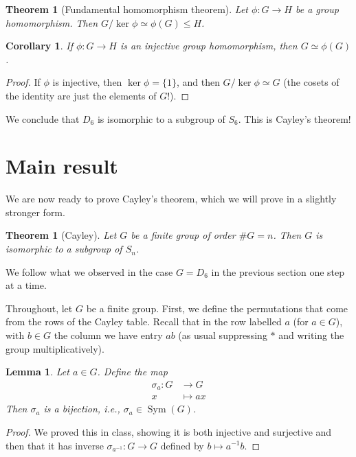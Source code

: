 \documentclass[12pt]{amsart}
\numberwithin{equation}{section}
\newtheorem{thm}[equation]{Theorem}
\newtheorem{lem}[equation]{Lemma}
\newtheorem{corollary}[equation]{Corollary}
\theoremstyle{definition}
\theoremstyle{remark}
\numberwithin{equation}{section}
\DeclareMathOperator{\Sym}{Sym}
\begin{document}
\begin{thm}[Fundamental homomorphism theorem]
Let $\phi \colon G \to H$ be a group homomorphism.  Then $G/\ker \phi \simeq \phi(G) \leq H$.
\end{thm}

\begin{corollary} \label{cor:injG}
If $\phi \colon G \to H$ is an injective group homomorphism, then $G \simeq \phi(G)$.
\end{corollary}

\begin{proof}
If $\phi$ is injective, then $\ker \phi =\{1\}$, and then $G/\ker \phi \simeq G$ (the cosets of the identity are just the elements of $G$!).
\end{proof}

We conclude that $D_6$ is isomorphic to a subgroup of $S_6$.  This is Cayley's theorem!  

\section{Main result} \label{sec:thm}

We are now ready to prove Cayley's theorem, which we will prove in a slightly stronger form.

\begin{thm}[Cayley]  \label{thm:Cayleyn}
Let $G$ be a finite group of order $\#G = n$.  Then $G$ is isomorphic to a subgroup of $S_n$.
\end{thm}

We follow what we observed in the case $G=D_6$ in the previous section one step at a time.

Throughout, let $G$ be a finite group.  First, we define the permutations that come from the rows of the Cayley table.  Recall that in the row labelled $a$ (for $a \in G$), with $b \in G$ the column we have entry $ab$ (as usual suppressing $*$ and writing the group multiplicatively).

\begin{lem}
Let $a \in G$.  Define the map
\begin{align*}
\sigma_a \colon G &\to G \\
x &\mapsto ax
\end{align*}
Then $\sigma_a$ is a bijection, i.e., $\sigma_a \in \Sym(G)$.   
\end{lem}

\begin{proof}
We proved this in class, showing it is both injective and surjective and then that it has inverse $\sigma_{a^{-1}} \colon G \to G$ defined by $b \mapsto a^{-1}b$.
\end{proof}
\end{document}
